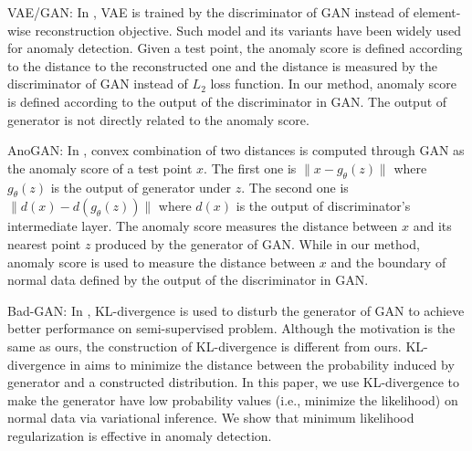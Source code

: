\documentclass[a4paper,conference]{IEEEtran}
\begin{document}
VAE/GAN: In \cite{larsen2015autoencoding},  VAE is trained  by the discriminator of  GAN instead of element-wise reconstruction objective. Such model and its variants have been widely used for anomaly detection. Given a test point, the anomaly score is  defined according to the distance to the reconstructed one and the distance is measured by the discriminator of GAN instead of $L_2$ loss function. In our method, anomaly score is defined according to the output of the discriminator in GAN. The output of generator is not directly related to the anomaly score.



AnoGAN: In \cite{schlegl2017unsupervised},  convex combination of two distances is computed through GAN as the anomaly score of a  test point $x$. The first one is  $\|x-g_\theta(z)\|$ where $g_\theta(z)$ is the output of generator under $z$. The second one is  $\|d(x) -d(g_\theta(z))\|$ where $d(x)$ is the output of discriminator's intermediate layer. The anomaly score measures the distance between $x$ and its nearest point $z$ produced by the generator of GAN. While in our method, anomaly score is used to measure the distance between $x$ and the boundary of normal data defined by the output of the discriminator in GAN.



Bad-GAN: In \cite{dai2017good}, KL-divergence is used to disturb the generator of GAN to achieve better performance on semi-supervised problem. Although the motivation is the same as ours, the construction of KL-divergence is different from ours. KL-divergence in \cite{dai2017good} aims to minimize the distance between the probability induced by generator  and a constructed distribution.  In this paper, we use KL-divergence  to make the generator have low probability values (i.e., minimize the likelihood) on normal data via variational inference. We show that minimum likelihood regularization is  effective in anomaly detection.
\end{document}
